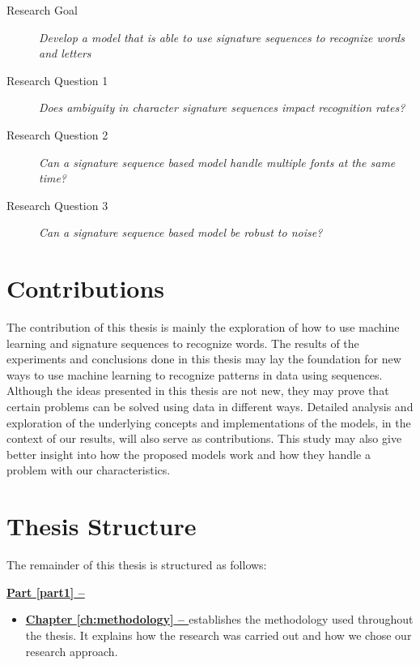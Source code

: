 \begin{description}
    \item[Research Goal]{\textit{Develop a model that is able to use signature sequences to recognize words and letters}}
    \item[Research Question 1]{\textit{Does ambiguity in character signature sequences impact recognition rates?}}
    \item[Research Question 2]{\textit{Can a signature sequence based model handle multiple fonts at the same time?}}
    \item[Research Question 3]{\textit{Can a signature sequence based model be robust to noise?}}
\end{description}


\section{Contributions}
\label{sec:contributions}
The contribution of this thesis is mainly the exploration of how to use machine learning and signature sequences to recognize words. The results of the experiments and conclusions done in this thesis may lay the foundation for new ways to use machine learning to recognize patterns in data using sequences. Although the ideas presented in this thesis are not new, they may prove that certain problems can be solved using data in different ways. Detailed analysis and exploration of the underlying concepts and implementations of the models, in the context of our results, will also serve as contributions. This study may also give better insight into how the proposed models work and how they handle a problem with our characteristics.


\section{Thesis Structure}
The remainder of this thesis is structured as follows:

\vspace{0.25cm}\noindent
\textbf{{\hyperref[part1]{Part \ref{part1} -- }}}
\begin{itemize}
    \item\textbf{\hyperref[ch:methodology]{Chapter \ref{ch:methodology} -- }} establishes the methodology used throughout the thesis. It explains how the research was carried out and how we chose our research approach.
\end{itemize}

